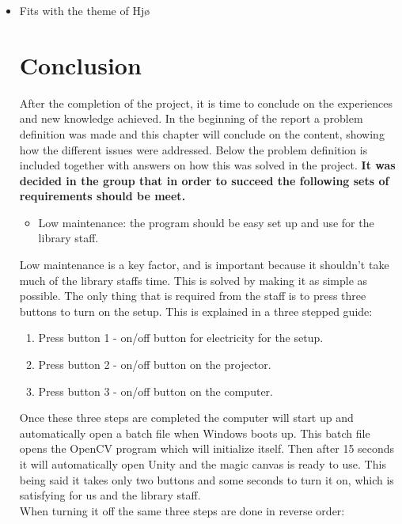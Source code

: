 \begin{itemize}
\item Fits with the theme of Hj{\o}\chapter{Conclusion}
After the completion of the project, it is time to conclude on the experiences and new knowledge achieved. In the beginning of the report a problem definition was made and this chapter will conclude on the content, showing how the different issues were addressed.
Below the problem definition is included together with answers on how this was solved in the project.
\textbf{It was decided in the group that in order to succeed the following sets of requirements should be meet.} 
\begin{itemize}
\item Low maintenance: the program should be easy set up and use for the library staff.
\end{itemize}
Low maintenance is a key factor, and is important because it shouldn't take much of the library staffs time. This is solved by making it as simple as possible. The only thing that is required from the staff is to press three buttons to turn on the setup. This is explained in a three stepped guide:
\begin{enumerate}
\item Press button 1 - on/off button for electricity for the setup.
\item Press button 2 - on/off button on the projector.
\item Press button 3 - on/off button on the computer.
\end{enumerate}
Once these three steps are completed the computer will start up and automatically open a batch file when Windows boots up. This batch file opens the OpenCV program which will initialize itself. Then after 15 seconds it will automatically open Unity and the magic canvas is ready to use. This being said it takes only two buttons and some seconds to turn it on, which is satisfying for us and the library staff.\\
When turning it off the same three steps are done in reverse order:
 

\end{itemize}
